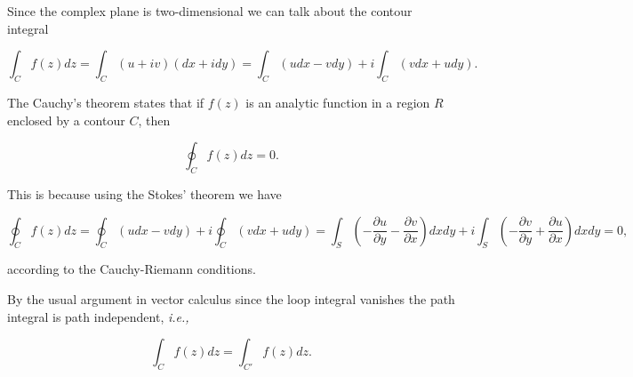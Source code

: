 \documentclass[english,a4paper,12pt]{report}
\begin{document}
Since the complex plane is two-dimensional we can talk about the contour integral 

\begin{equation}
    \int_{C}^{} f(z) dz = \int_{C}^{} (u+iv)(dx+idy) = \int_{C}^{} (udx-vdy) + i\int_{C}^{} (vdx+udy).   
\end{equation}

The Cauchy's theorem states that if \(f(z)\) is an analytic function in a region \(R\) enclosed by a contour \(C\), then 

\begin{equation}
    \oint_{C} f(z)dz = 0. \label{cau} 
\end{equation}

This is because using the Stokes' theorem we have 

\begin{equation}
    \oint_{C}f(z) dz = \oint_{C} (udx-vdy) + i \oint_{C} (vdx+udy) = \int_{S}^{} \left( -\frac{\partial u}{\partial y} - \frac{\partial v}{\partial x}  \right) dxdy + i \int_{S}^{} \left( -\frac{\partial v}{\partial y} + \frac{\partial u}{\partial x}   \right)  dxdy = 0,
\end{equation}

according to the Cauchy-Riemann conditions.

By the usual argument in vector calculus since the loop integral vanishes the path integral is path independent, \textit{i.e.,} 

\begin{equation}
    \int_{C}^{} f(z)dz = \int_{C'}^{} f(z)dz.  
\end{equation}
\end{document}
